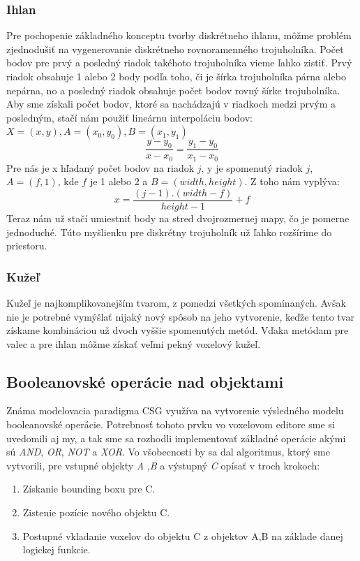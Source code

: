 	\subsubsection{Ihlan}
	Pre pochopenie základného konceptu tvorby diskrétneho ihlanu, môžme problém zjednodušiť na vygenerovanie diskrétneho rovnoramenného trojuholníka.
	Počet bodov pre prvý a posledný riadok takéhoto trojuholníka vieme ľahko zistiť. Prvý riadok obsahuje 1 alebo 2 body podľa toho, či je šírka trojuholníka párna alebo nepárna, no a posledný riadok obsahuje počet bodov rovný šírke trojuholníka. Aby sme získali počet bodov, ktoré sa nachádzajú v riadkoch medzi prvým a posledným, stačí nám použiť lineárnu interpoláciu bodov: 
	$X = (x,y), A = (x_0, y_0), B = (x_1, y_1)$ 
	\begin{displaymath}
	\frac{y - y_0}{x - x_0} = \frac{y_1 - y_0}{x_1 - x_0} 
	\end{displaymath}
	Pre nás je x hľadaný počet bodov na riadok $j$, y je spomenutý riadok $j$, $A = (f , 1)$, kde $f$ je 1 alebo 2 a $B = (width, height)$. Z toho nám vyplýva:
	\begin{displaymath}
		x = \frac{(j - 1) . (width - f)}{height - 1} + f
	\end{displaymath}
	Teraz nám už stačí umiestniť body na stred dvojrozmernej mapy, čo je pomerne jednoduché.
	Túto myšlienku pre diskrétny trojuholník už ľahko rozšírime do priestoru.
	\subsubsection{Kužeľ}
	Kužeľ je najkomplikovanejším tvarom, z pomedzi všetkých spomínaných. Avšak nie je potrebné vymýšlať nijaký nový spôsob na jeho vytvorenie, keďže tento tvar získame kombináciou už dvoch vyššie spomenutých metód. Vďaka metódam pre valec a pre ihlan môžme získať veľmi pekný voxelový kužeľ.


\subsection{Booleanovské operácie nad objektami}
Známa modelovacia paradigma CSG využíva na vytvorenie výsledného modelu booleanovské operácie. Potrebnosť tohoto prvku vo voxelovom editore sme si uvedomili aj my, a tak sme sa rozhodli implementovať základné operácie akými sú \textit{AND}, \textit{OR}, \textit{NOT} a \textit{XOR}.
Vo všobecnosti by sa dal algoritmus, ktorý sme vytvorili, pre vstupné objekty \textit{A} ,\textit{B} a výstupný \textit{C} opísať v troch krokoch:
\begin{enumerate}
\item Získanie bounding boxu pre C.
\item Zistenie pozície nového objektu C.
\item Postupné vkladanie voxelov do objektu C z objektov A,B na základe danej logickej funkcie.
\end{enumerate} 

